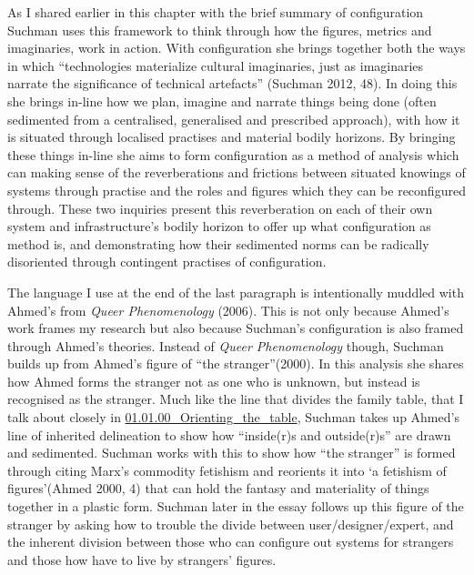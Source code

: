 As I shared earlier in this chapter with the brief summary of
configuration Suchman uses this framework to think through how the
figures, metrics and imaginaries, work in action. With configuration she
brings together both the ways in which ``technologies materialize
cultural imaginaries, just as imaginaries narrate the significance of
technical artefacts'' (Suchman 2012, 48). In doing this she brings
in-line how we plan, imagine and narrate things being done (often
sedimented from a centralised, generalised and prescribed approach),
with how it is situated through localised practises and material bodily
horizons. By bringing these things in-line she aims to form
configuration as a method of analysis which can making sense of the
reverberations and frictions between situated knowings of systems
through practise and the roles and figures which they can be
reconfigured through. These two inquiries present this reverberation on
each of their own system and infrastructure's bodily horizon to offer up
what configuration as method is, and demonstrating how their sedimented
norms can be radically disoriented through contingent practises of
configuration.

The language I use at the end of the last paragraph is intentionally
muddled with Ahmed's from \emph{Queer Phenomenology} (2006). This is not
only because Ahmed's work frames my research but also because Suchman's
configuration is also framed through Ahmed's theories. Instead of
\emph{Queer Phenomenology} though, Suchman builds up from Ahmed's figure
of ``the stranger''(2000). In this analysis she shares how Ahmed forms
the stranger not as one who is unknown, but instead is recognised as the
stranger. Much like the line that divides the family table, that I talk
about closely in
\href{../../01_Disability_justice_and_life_affirmation_flipping_the_table/sections/01.01.00_Orienting_the_table.md}{01.01.00\_Orienting\_the\_table},
Suchman takes up Ahmed's line of inherited delineation to show how
``inside(r)s and outside(r)s'' are drawn and sedimented. Suchman works
with this to show how ``the stranger'' is formed through citing Marx's
commodity fetishism and reorients it into `a fetishism of figures'(Ahmed
2000, 4) that can hold the fantasy and materiality of things together in
a plastic form. Suchman later in the essay follows up this figure of the
stranger by asking how to trouble the divide between
user/designer/expert, and the inherent division between those who can
configure out systems for strangers and those how have to live by
strangers' figures.

